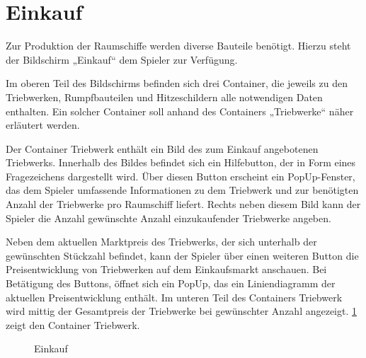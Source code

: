 \section{Einkauf}
\label{sec:ui-einkauf}

Zur Produktion der Raumschiffe werden diverse Bauteile benötigt. Hierzu steht der Bildschirm „Einkauf“ dem Spieler zur Verfügung.
 
Im oberen Teil des Bildschirms befinden sich drei Container, die jeweils zu den Triebwerken, Rumpfbauteilen und Hitzeschildern alle notwendigen Daten enthalten. Ein solcher Container soll anhand des Containers „Triebwerke“ näher erläutert werden. 
 
Der Container Triebwerk enthält ein Bild des zum Einkauf angebotenen Triebwerks. Innerhalb des Bildes befindet sich ein Hilfebutton, der in Form eines Fragezeichens dargestellt wird. Über diesen Button erscheint ein PopUp-Fenster, das dem Spieler umfassende Informationen zu dem Triebwerk und zur benötigten Anzahl der Triebwerke pro Raumschiff liefert. Rechts neben diesem Bild kann der Spieler die Anzahl gewünschte Anzahl einzukaufender Triebwerke angeben.
 
Neben dem aktuellen Marktpreis des  Triebwerks, der sich unterhalb der gewünschten Stückzahl befindet, kann der Spieler über einen weiteren Button die Preisentwicklung von Triebwerken auf dem Einkaufsmarkt anschauen. Bei Betätigung des Buttons, öffnet sich ein PopUp, das ein Liniendiagramm der aktuellen Preisentwicklung enthält. Im unteren Teil des Containers Triebwerk wird mittig der Gesamtpreis der Triebwerke bei gewünschter Anzahl angezeigt. \ref{img:ui-triebwerk}  zeigt den Container Triebwerk.

\begin{figure}[h]
  \centering
  \caption{Einkauf}
  \label{img:ui-triebwerk}
\end{figure}
 
